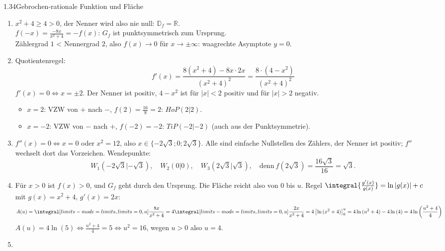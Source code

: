 \begin{loesung}{1.34}{Gebrochen-rationale Funktion und Fläche}
\begin{enumerate}[label=\alph*)]
  \item $x^2+4\geq 4>0$, der Nenner wird also nie null: $\mathds{D}_f = \mathds{R}$.\\
  $f(-x) = \frac{-8x}{x^2+4} = -f(x)$: $G_f$ ist punktsymmetrisch zum Ursprung.\\
  Zählergrad $1$ < Nennergrad $2$, also $f(x)\longrightarrow 0$ für $x\longrightarrow\pm\infty$: waagrechte Asymptote $y=0$.
  \item Quotientenregel:
  \[f'(x) = \dfrac{8(x^2+4)-8x\cdot 2x}{(x^2+4)^2} = \dfrac{8\cdot(4-x^2)}{(x^2+4)^2}\]
  $f'(x)=0\Longleftrightarrow x=\pm 2$. Der Nenner ist positiv, $4-x^2$ ist für $|x|<2$ positiv und für $|x|>2$ negativ.
  \begin{itemize}
    \item $x=2$: VZW von $+$ nach $-$, $f(2) = \frac{16}{8} = 2$: $HoP(2|2)$.
    \item $x=-2$: VZW von $-$ nach $+$, $f(-2) = -2$: $TiP(-2|-2)$ (auch aus der Punktsymmetrie).
  \end{itemize}
  \item $f''(x)=0\Longleftrightarrow x=0$ oder $x^2=12$, also $x\in\{-2\sqrt{3};0;2\sqrt{3}\}$. Alle sind einfache Nullstellen des Zählers, der Nenner ist positiv; $f''$ wechselt dort das Vorzeichen. Wendepunkte:
  \[W_1(-2\sqrt{3}|-\sqrt{3}),\quad W_2(0|0),\quad W_3(2\sqrt{3}|\sqrt{3}),\quad\text{denn}\ f(2\sqrt{3}) = \dfrac{16\sqrt{3}}{16} = \sqrt{3}.\]
  \item Für $x>0$ ist $f(x)>0$, und $G_f$ geht durch den Ursprung. Die Fläche reicht also von $0$ bis $u$. Regel $\integral{\frac{g'(x)}{g(x)}} = \ln{|g(x)|}+c$ mit $g(x) = x^2+4$, $g'(x) = 2x$:
  \[A(u) = \integral[limits-mode=limits,limits={0, u}]{\dfrac{8x}{x^2+4}} = 4\integral[limits-mode=limits,limits={0, u}]{\dfrac{2x}{x^2+4}} = 4\left[\ln{(x^2+4)}\right]_0^u = 4\ln{(u^2+4)}-4\ln{(4)} = 4\ln{\left(\dfrac{u^2+4}{4}\right)}\]
  $A(u) = 4\ln{(5)}\Longleftrightarrow\frac{u^2+4}{4} = 5\Longleftrightarrow u^2 = 16$, wegen $u>0$ also $u = 4$.
  \item
  \begin{center}
  \end{center}
\end{enumerate}
\end{loesung}

